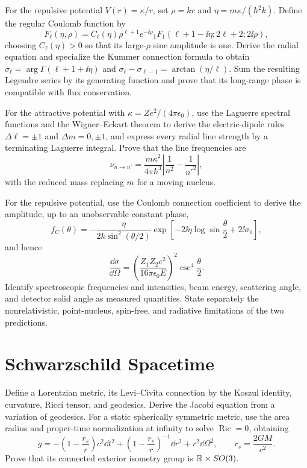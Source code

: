 \begin{exercise}
For the repulsive potential $V(r)=\kappa/r$, set $\rho=kr$ and
$\eta=m\kappa/(\hbar^2k)$.  Define the regular Coulomb function by
\[
 F_\ell(\eta,\rho)=C_\ell(\eta)\rho^{\ell+1}e^{-\ii\rho}
 {}_1F_1(\ell+1-\ii\eta;2\ell+2;2\ii\rho),
\]
choosing $C_\ell(\eta)>0$ so that its large-$\rho$ sine amplitude is one.
Derive the radial equation and specialize the Kummer connection formula to
obtain
$\sigma_\ell=\arg\Gamma(\ell+1+\ii\eta)$ and
$\sigma_\ell-\sigma_{\ell-1}=\arctan(\eta/\ell)$.  Sum the resulting
Legendre series by its generating function and prove that its long-range
phase is compatible with flux conservation.
\end{exercise}

\begin{exercise}
For the attractive potential with
$\kappa=Ze^2/(4\pi\epsilon_0)$, use the Laguerre spectral functions and the
Wigner--Eckart theorem to derive the electric-dipole rules
$\Delta\ell=\pm1$ and $\Delta m=0,\pm1$, and express every radial line
strength by a terminating Laguerre integral.  Prove that the line frequencies
are
\[
 \nu_{n\to n'}=\frac{m\kappa^2}{4\pi\hbar^3}
 \left|\frac1{n^2}-\frac1{{n'}^2}\right|,
\]
with the reduced mass replacing $m$ for a moving nucleus.

For the repulsive potential, use the Coulomb connection coefficient to derive
the amplitude, up to an unobservable constant phase,
\[
 f_C(\theta)=-\frac{\eta}{2k\sin^2(\theta/2)}
 \exp\!\left[-2\ii\eta\log\sin\frac\theta2+2\ii\sigma_0\right],
\]
and hence
\[
 \frac{\dd\sigma}{\dd\Omega}=
 \left(\frac{Z_1Z_2e^2}{16\pi\epsilon_0E}\right)^2
 \csc^4\frac\theta2.
\]
Identify spectroscopic frequencies and intensities, beam energy, scattering
angle, and detector solid angle as measured quantities.  State separately
the nonrelativistic, point-nucleus, spin-free, and radiative limitations of
the two predictions.
\end{exercise}

\section{Schwarzschild Spacetime}

\begin{exercise}
Define a Lorentzian metric, its Levi--Civita connection by the Koszul identity,
curvature, Ricci tensor, and geodesics.  Derive the Jacobi equation from a
variation of geodesics.  For a static spherically symmetric metric, use the
area radius and proper-time normalization at infinity to solve
$\operatorname{Ric}=0$, obtaining
\[
 g=-\left(1-\frac{r_s}{r}\right)c^2\dd t^2
 +\left(1-\frac{r_s}{r}\right)^{-1}\dd r^2+r^2\dd\Omega^2,
 \qquad r_s=\frac{2GM}{c^2}.
\]
Prove that its connected exterior isometry group is
$\mathbb R\times SO(3)$.
\end{exercise}

